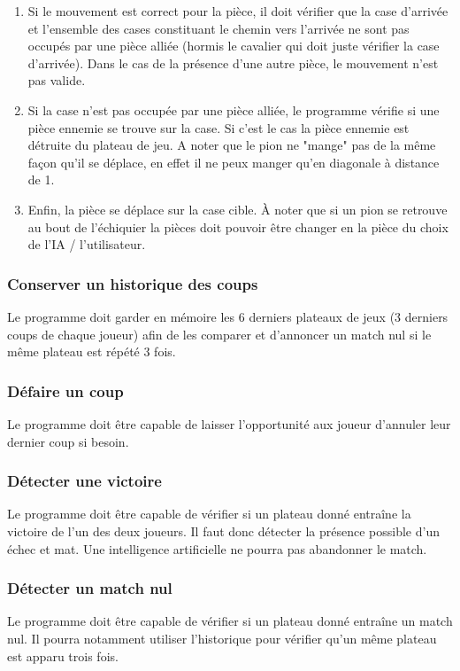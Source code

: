 \huge\documentclass{article}
\begin{document}
\begin{enumerate}
\begin{itemize}
        \end{itemize}
        \item Si le mouvement est correct pour la pièce, il doit vérifier que la case d'arrivée et l'ensemble des cases constituant le chemin vers l'arrivée ne sont pas occupés par une pièce alliée (hormis le cavalier qui doit juste vérifier la case d'arrivée). Dans le cas de la présence d'une autre pièce, le mouvement n'est pas valide.
        \item Si la case n'est pas occupée par une pièce alliée, le programme vérifie si une pièce ennemie se trouve sur la case.
        Si c'est le cas la pièce ennemie est détruite du plateau de jeu.
        A noter que le pion ne "mange" pas de la même façon qu'il se déplace, en effet il ne peux manger qu'en diagonale à distance de 1.
        \item Enfin, la pièce se déplace sur la case cible.
        À noter que si un pion se retrouve au bout de l'échiquier la pièces doit pouvoir être changer en la pièce du choix de l'IA / l'utilisateur.
    \end{enumerate}
    \medskip
    \subsubsection{Conserver un historique des coups}
    Le programme doit garder en mémoire les 6 derniers plateaux de jeux (3 derniers coups de chaque joueur) afin de les comparer et d'annoncer un match nul si le même plateau est répété 3 fois.
    \medskip
    \subsubsection{Défaire un coup}
    Le programme doit être capable de laisser l'opportunité aux joueur d'annuler leur dernier coup si besoin.

    \subsubsection{Détecter une victoire}
    Le programme doit être capable de vérifier si un plateau donné entraîne la victoire de l'un des deux joueurs. Il faut donc détecter la présence possible d'un échec et mat. Une intelligence artificielle ne pourra pas abandonner le match.
    \subsubsection{Détecter un match nul}

    Le programme doit être capable de vérifier si un plateau donné entraîne un match nul. Il pourra notamment utiliser l'historique pour vérifier qu'un même plateau est apparu trois fois.
\end{document}

